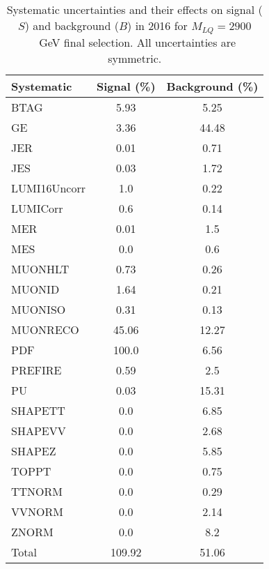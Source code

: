 \begin{table}[htbp]
\begin{center}
\caption{Systematic uncertainties and their effects on signal ($S$) and background ($B$) in 2016 for $M_{LQ}=2900$~GeV final selection. All uncertainties are symmetric.}
\begin{tabular}{lcc}
\hline\hline
Systematic & Signal (\%) & Background (\%) \\ \hline 
BTAG & 5.93 & 5.25\\ 
GE & 3.36 & 44.48\\ 
JER & 0.01 & 0.71\\ 
JES & 0.03 & 1.72\\ 
LUMI16Uncorr & 1.0 & 0.22\\ 
LUMICorr & 0.6 & 0.14\\ 
MER & 0.01 & 1.5\\ 
MES & 0.0 & 0.6\\ 
MUONHLT & 0.73 & 0.26\\ 
MUONID & 1.64 & 0.21\\ 
MUONISO & 0.31 & 0.13\\ 
MUONRECO & 45.06 & 12.27\\ 
PDF & 100.0 & 6.56\\ 
PREFIRE & 0.59 & 2.5\\ 
PU & 0.03 & 15.31\\ 
SHAPETT & 0.0 & 6.85\\ 
SHAPEVV & 0.0 & 2.68\\ 
SHAPEZ & 0.0 & 5.85\\ 
TOPPT & 0.0 & 0.75\\ 
TTNORM & 0.0 & 0.29\\ 
VVNORM & 0.0 & 2.14\\ 
ZNORM & 0.0 & 8.2\\ 
Total & 109.92 & 51.06\\ \hline \hline
\end{tabular}
\label{tab:SysUncertainties_uujj_2900}
\end{center}
\end{table}

